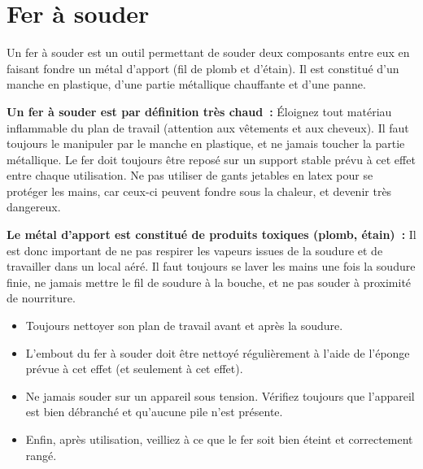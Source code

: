 \section*{Fer à souder}
Un fer à souder est un outil permettant de souder deux composants entre eux en faisant fondre un métal d’apport (fil de plomb et d’étain). Il est constitué d’un manche en plastique, d’une partie métallique chauffante et d’une panne.

\textbf{Un fer à souder est par définition très chaud~:} Éloignez tout matériau inflammable du plan de travail (attention aux vêtements et aux cheveux). Il faut toujours le manipuler par le manche en plastique, et ne jamais toucher la partie métallique. Le fer doit toujours être reposé sur un support stable prévu à cet effet entre chaque utilisation. Ne pas utiliser de gants jetables en latex pour se protéger les mains, car ceux-ci peuvent fondre sous la chaleur, et devenir très dangereux.

\textbf{Le métal d’apport est constitué de produits toxiques (plomb, étain)~:} Il est donc important de ne pas respirer les vapeurs issues de la soudure et de travailler dans un local aéré. Il faut toujours se laver les mains une fois la soudure finie, ne jamais mettre le fil de soudure à la bouche, et ne pas souder à proximité de nourriture.


\begin{itemize}
\item Toujours nettoyer son plan de travail avant et après la soudure.
\item L’embout du fer à souder doit être nettoyé régulièrement à l’aide de l’éponge prévue à cet effet (et seulement à cet effet).
\item Ne jamais souder sur un appareil sous tension. Vérifiez toujours que l’appareil est bien débranché et qu’aucune pile n’est présente.
\item Enfin, après utilisation, veilliez à ce que le fer soit bien éteint et correctement rangé.
\end{itemize}

